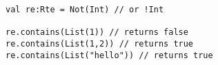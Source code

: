 \begin{lstlisting}[style=scalaioScala]
val re:Rte = Not(Int) // or !Int

re.contains(List(1)) // returns false
re.contains(List(1,2)) // returns true
re.contains(List("hello")) // returns true
\end{lstlisting}
